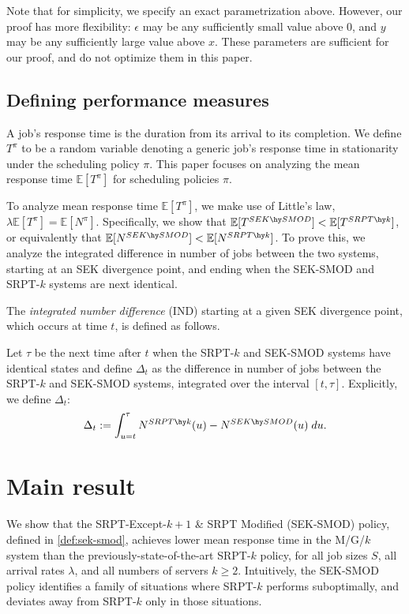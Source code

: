 \documentclass[acmsmall]{acmart}
\newcommand{\E}[1]{\mathbb{E}[#1]}
\begin{document}
Note that for simplicity, we specify an exact parametrization above.
However, our proof has more flexibility: $\epsilon$ may be any sufficiently small value above 0, and $y$ may be any sufficiently large value above $x$. These parameters are sufficient for our proof, and do not optimize them in this paper.


\subsection{Defining performance measures}

A job's response time is the duration from its arrival to its completion.
We define $T^\pi$ to be a random variable denoting a generic job's response time in stationarity under the scheduling policy $\pi$.
This paper focuses on analyzing the mean response time $\E{T^\pi}$ for scheduling policies $\pi$.

To analyze mean response time $\E{T^\pi}$, we make use of Little's law, $\lambda \E{T^\pi} = \E{N^\pi}$. Specifically, we show that $\E{T^{SEK \hy SMOD}} < \E{T^{SRPT\hy k}}$, or equivalently that $\E{N^{SEK \hy SMOD}} < \E{N^{SRPT\hy k}}$. 
To prove this, we analyze the integrated difference in number of jobs between the two systems, starting at an SEK divergence point, and ending when the SEK-SMOD and SRPT-$k$ systems are next identical.

\begin{definition}
    \label{def:ind}
    The \textit{integrated number difference} (IND) starting at a given SEK divergence point, which occurs at time $t$, is defined as follows.

    Let $\tau$ be the next time after $t$ when the SRPT-$k$ and SEK-SMOD systems have identical states and define $\Delta_t$ as the difference in number of jobs between the SRPT-$k$ and SEK-SMOD systems, integrated over the interval $[t, \tau]$. Explicitly, we define $\Delta_t$:
    \begin{align*}
        \Delta_t := \int_{u=t}^\tau N^{SRPT\hy k}(u) - N^{SEK \hy SMOD}(u)\; du.
    \end{align*}
\end{definition}


\section{Main result}

We show that the SRPT-Except-$k+1$ \& SRPT Modified (SEK-SMOD) policy, defined in \cref{def:sek-smod}, achieves lower mean response time in the M/G/$k$ system than the previously-state-of-the-art SRPT-$k$ policy, for all job sizes $S$, all arrival rates $\lambda$, and all numbers of servers $k \ge 2$.
Intuitively, the SEK-SMOD policy identifies a family of situations where SRPT-$k$ performs suboptimally, and deviates away from SRPT-$k$ only in those situations.
\end{document}
